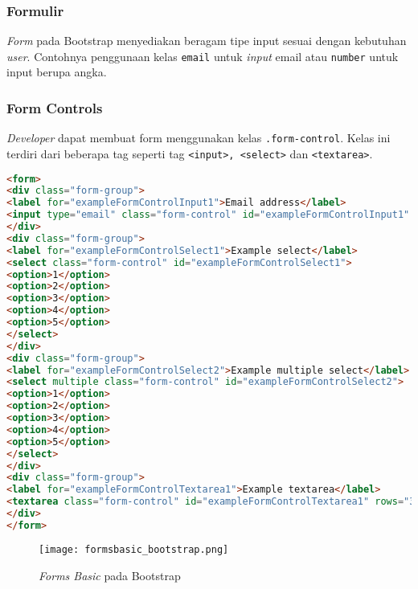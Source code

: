 \subsubsection{Formulir}
\textit{Form} pada Bootstrap menyediakan beragam tipe input sesuai dengan kebutuhan \textit{user}. Contohnya penggunaan kelas \texttt{email} untuk \textit{input} email atau \texttt{number} untuk input berupa angka.
\subsubsection{Form Controls}
\textit{Developer} dapat membuat form menggunakan kelas \texttt{.form-control}. Kelas ini terdiri dari beberapa tag seperti tag \texttt{<input>, <select>} dan \texttt{<textarea>}.
\begin{lstlisting}[language=HTML,  basicstyle=\ttfamily, frame=single, columns=fullflexible, keepspaces=true, breaklines=true, showstringspaces=false, label={lst:formControlsBootstrap}, caption=Form controls pada bootstrap 4.]  
<form>
<div class="form-group">
<label for="exampleFormControlInput1">Email address</label>
<input type="email" class="form-control" id="exampleFormControlInput1" placeholder="name@example.com">
</div>
<div class="form-group">
<label for="exampleFormControlSelect1">Example select</label>
<select class="form-control" id="exampleFormControlSelect1">
<option>1</option>
<option>2</option>
<option>3</option>
<option>4</option>
<option>5</option>
</select>
</div>
<div class="form-group">
<label for="exampleFormControlSelect2">Example multiple select</label>
<select multiple class="form-control" id="exampleFormControlSelect2">
<option>1</option>
<option>2</option>
<option>3</option>
<option>4</option>
<option>5</option>
</select>
</div>
<div class="form-group">
<label for="exampleFormControlTextarea1">Example textarea</label>
<textarea class="form-control" id="exampleFormControlTextarea1" rows="3"></textarea>
</div>
</form>
\end{lstlisting}

\begin{figure} [H]
	\centering  
	\texttt{[image: formsbasic\_bootstrap.png]}  
	\caption{\textit{Forms Basic} pada Bootstrap} 
	\label{fig:formBootstrap}
\end{figure} 

